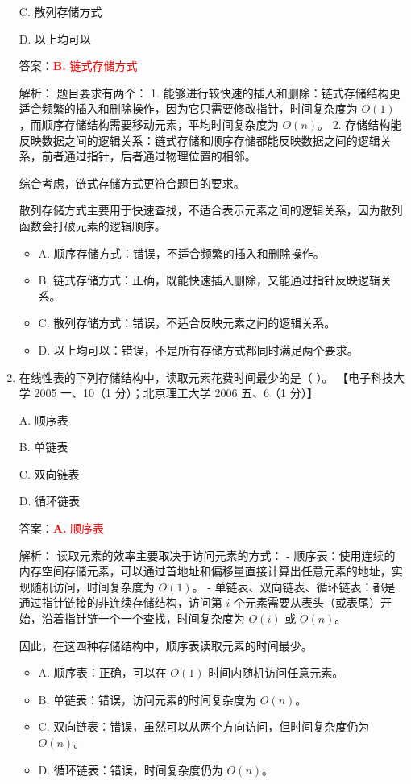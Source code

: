 \documentclass[lang=cn,newtx,10pt,scheme=chinese]{../../../elegantbook}
\begin{document}
\begin{enumerate}
        C. 散列存储方式
    
        D. 以上均可以  

        答案：\textcolor{red}{\textbf{B.} 链式存储方式}

        解析：
        题目要求有两个：
        1. 能够进行较快速的插入和删除：链式存储结构更适合频繁的插入和删除操作，因为它只需要修改指针，时间复杂度为 $O(1)$，而顺序存储结构需要移动元素，平均时间复杂度为 $O(n)$。
        2. 存储结构能反映数据之间的逻辑关系：链式存储和顺序存储都能反映数据之间的逻辑关系，前者通过指针，后者通过物理位置的相邻。

        综合考虑，链式存储方式更符合题目的要求。

        散列存储方式主要用于快速查找，不适合表示元素之间的逻辑关系，因为散列函数会打破元素的逻辑顺序。

        \begin{itemize}
            \item A. 顺序存储方式：错误，不适合频繁的插入和删除操作。
            \item B. 链式存储方式：正确，既能快速插入删除，又能通过指针反映逻辑关系。
            \item C. 散列存储方式：错误，不适合反映元素之间的逻辑关系。
            \item D. 以上均可以：错误，不是所有存储方式都同时满足两个要求。
        \end{itemize}
    
        \item 在线性表的下列存储结构中，读取元素花费时间最少的是（ ）。  
        【电子科技大学 2005 一、10（1 分）；北京理工大学 2006 五、6（1 分）】  
    
        A. 顺序表  
    
        B. 单链表  
    
        C. 双向链表  
    
        D. 循环链表  

        答案：\textcolor{red}{\textbf{A.} 顺序表}

        解析：
        读取元素的效率主要取决于访问元素的方式：
        - 顺序表：使用连续的内存空间存储元素，可以通过首地址和偏移量直接计算出任意元素的地址，实现随机访问，时间复杂度为 $O(1)$。
        - 单链表、双向链表、循环链表：都是通过指针链接的非连续存储结构，访问第 $i$ 个元素需要从表头（或表尾）开始，沿着指针链一个一个查找，时间复杂度为 $O(i)$ 或 $O(n)$。

        因此，在这四种存储结构中，顺序表读取元素的时间最少。

        \begin{itemize}
            \item A. 顺序表：正确，可以在 $O(1)$ 时间内随机访问任意元素。
            \item B. 单链表：错误，访问元素的时间复杂度为 $O(n)$。
            \item C. 双向链表：错误，虽然可以从两个方向访问，但时间复杂度仍为 $O(n)$。
            \item D. 循环链表：错误，时间复杂度仍为 $O(n)$。
        \end{itemize}
    

\end{enumerate}
\end{document}

